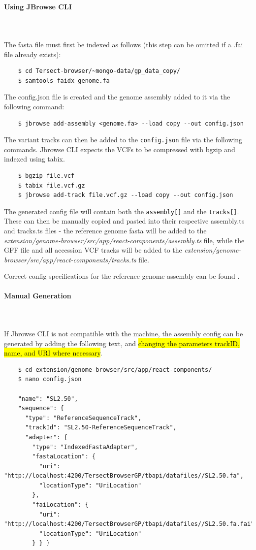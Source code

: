 \documentclass[12pt]{article}
\begin{document}
\paragraph{Using JBrowse CLI}\mbox{}
\\\\
The fasta file must first be indexed as follows (this step can be omitted if a .fai file already exists):
\lstset{
  language=bash,
  basicstyle=\ttfamily
}
\begin{lstlisting}
    $ cd Tersect-browser/~mongo-data/gp_data_copy/
    $ samtools faidx genome.fa 
\end{lstlisting}
The config.json file is created and the genome assembly added to it via the following command:
\begin{lstlisting}
    $ jbrowse add-assembly <genome.fa> --load copy --out config.json
\end{lstlisting}
The variant tracks can then be added to the \verb+config.json+ file via the following commands. Jbrowse CLI expects the VCFs to be compressed with bgzip and indexed using tabix. 
\begin{lstlisting}
    $ bgzip file.vcf 
    $ tabix file.vcf.gz 
    $ jbrowse add-track file.vcf.gz --load copy --out config.json 
\end{lstlisting}
The generated config file will contain both the \verb+assembly[]+ and the \verb+tracks[]+. These can then be manually copied and pasted into their respective assembly.ts and tracks.ts files - the reference genome fasta will be added to the \textit{extension/genome-browser/src/app/react-components/assembly.ts} file, while the GFF file and all accession VCF tracks will be added to the \textit{extension/genome-browser/src/app/react-components/tracks.ts} file.

Correct config specifications for the reference genome assembly can be found . 

\paragraph{Manual Generation}\mbox{}
\\\\
If Jbrowse CLI is not compatible with the machine, the assembly config can be generated by adding the following text, and \hl{changing the parameters trackID, name, and URI where necessary}. 

\begin{lstlisting}
    $ cd extension/genome-browser/src/app/react-components/
    $ nano config.json

    "name": "SL2.50", 
    "sequence": { 
      "type": "ReferenceSequenceTrack", 
      "trackId": "SL2.50-ReferenceSequenceTrack", 
      "adapter": { 
        "type": "IndexedFastaAdapter", 
        "fastaLocation": { 
          "uri": "http://localhost:4200/TersectBrowserGP/tbapi/datafiles//SL2.50.fa", 
          "locationType": "UriLocation" 
        }, 
        "faiLocation": { 
          "uri": "http://localhost:4200/TersectBrowserGP/tbapi/datafiles//SL2.50.fa.fai", 
          "locationType": "UriLocation" 
        } } } 
\end{lstlisting}
\end{document}
